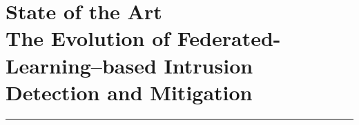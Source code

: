 \chapter[State of the Art]{State of the Art\\%
\Large The Evolution of Federated-Learning--based Intrusion Detection and Mitigation\label{chap:sota}}

\vspace{-9ex}
\localtableofcontents
\par\noindent\rule{\textwidth}{0.4pt}








